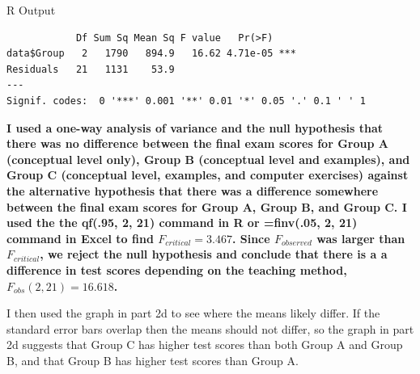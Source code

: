 \documentclass[11pt, oneside]{article}   	%
\newenvironment{answer}{\begin{adjustwidth}{.6cm}{}\bfseries}{\end{adjustwidth}}
\begin{document}
R Output
\begin{lstlisting}
            Df Sum Sq Mean Sq F value   Pr(>F)    
data$Group   2   1790   894.9   16.62 4.71e-05 ***
Residuals   21   1131    53.9                     
---
Signif. codes:  0 '***' 0.001 '**' 0.01 '*' 0.05 '.' 0.1 ' ' 1
\end{lstlisting}
\begin{answer}
I used a one-way analysis of variance and the null hypothesis that there was no difference between the final exam scores for Group A (conceptual level only), Group B (conceptual level and examples), and Group C (conceptual level, examples, and computer exercises) against the alternative hypothesis that there was a difference somewhere between the final exam scores for Group A, Group B, and Group C. I used the the qf(.95, 2, 21) command in R or =finv(.05, 2, 21) command in Excel to find $F_{critical} = 3.467$. Since $F_{observed}$ was larger than $F_{critical}$, we reject the null hypothesis and conclude that there is a a difference in test scores depending on the teaching method, $F_{obs}(2, 21) = 16.618$. 

I then used the graph in part 2d to see where the means likely differ. If the standard error bars overlap then the means should not differ, so the graph in part 2d suggests that Group C has higher test scores than both Group A and Group B, and that Group B has higher test scores than Group A.
\end{answer}
\end{document}
